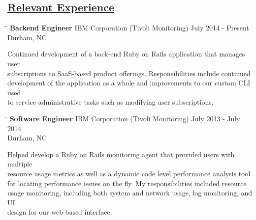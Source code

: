 \documentclass[8pt]{res}
\begin{document}
\begin{resume}
    \section{\underline{Relevant Experience}}
    \vspace{-0.08in}	
    \begin{tabbing}
      \hspace{2.3in}\= \hspace{2.6in}\= \kill %
      \textbf{Backend Engineer} \>IBM Corporation (Tivoli Monitoring) \>July 2014 - Present\\ \>Durham, NC
    \end{tabbing}\vspace{-20pt}      %
    Continued development of a back-end Ruby on Rails application that manages user\\
    subscriptions to SaaS-based product offerings. Responsibilities include continued\\
    development of the application as a whole and improvements to our custom CLI used\\
    to service administrative tasks such as modifying user subscriptions.
    \begin{tabbing}
      \hspace{2.3in}\= \hspace{2.6in}\= \kill %
      \textbf{Software Engineer} \>IBM Corporation (Tivoli Monitoring) \>July 2013 - July 2014\\ \>Durham, NC
    \end{tabbing}\vspace{-20pt}      %
    Helped develop a Ruby on Rails monitoring agent that provided users with multiple\\
    resource usage metrics as well as a dynamic code level performance analysis tool\\
    for locating performance issues on the fly. My responsibilities included resource\\
    usage monitoring, including both system and network usage, log monitoring, and UI\\
    design for our web-based interface.
    \begin{tabbing}

\end{tabbing}
\end{resume}
\end{document}
